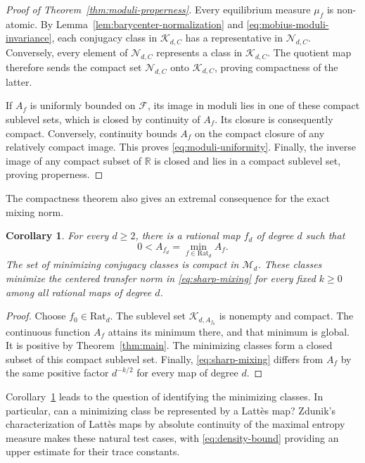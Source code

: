 \documentclass[11pt,reqno]{amsart}
\theoremstyle{plain}
\newtheorem{corollary}[theorem]{Corollary}
\theoremstyle{definition}
\theoremstyle{remark}
\newcommand{\R}{\mathbb R}
\numberwithin{equation}{section}
\begin{document}
\begin{proof}[Proof of Theorem~\ref{thm:moduli-properness}]
Every equilibrium measure $\mu_f$ is non-atomic. By Lemma~\ref{lem:barycenter-normalization} and \eqref{eq:mobius-moduli-invariance}, each conjugacy class in $\mathcal K_{d,C}$ has a representative in $\mathcal N_{d,C}$. Conversely, every element of $\mathcal N_{d,C}$ represents a class in $\mathcal K_{d,C}$. The quotient map therefore sends the compact set $\mathcal N_{d,C}$ onto $\mathcal K_{d,C}$, proving compactness of the latter.

If $A_f$ is uniformly bounded on $\mathcal F$, its image in moduli lies in one of these compact sublevel sets, which is closed by continuity of $A_f$. Its closure is consequently compact. Conversely, continuity bounds $A_f$ on the compact closure of any relatively compact image. This proves \eqref{eq:moduli-uniformity}. Finally, the inverse image of any compact subset of $\R$ is closed and lies in a compact sublevel set, proving properness.
\end{proof}

The compactness theorem also gives an extremal consequence for the exact mixing norm.

\begin{corollary}\label{cor:moduli-minimum}
For every $d\ge2$, there is a rational map $f_d$ of degree $d$ such that
\[
 0<A_{f_d}=\min_{f\in\mathrm{Rat}_d}A_f.
\]
The set of minimizing conjugacy classes is compact in $\mathcal M_d$. These classes minimize the centered transfer norm in \eqref{eq:sharp-mixing} for every fixed $k\ge0$ among all rational maps of degree $d$.
\end{corollary}

\begin{proof}
Choose $f_0\in\mathrm{Rat}_d$. The sublevel set $\mathcal K_{d,A_{f_0}}$ is nonempty and compact. The continuous function $A_f$ attains its minimum there, and that minimum is global. It is positive by Theorem~\ref{thm:main}. The minimizing classes form a closed subset of this compact sublevel set. Finally, \eqref{eq:sharp-mixing} differs from $A_f$ by the same positive factor $d^{-k/2}$ for every map of degree $d$.
\end{proof}


Corollary~\ref{cor:moduli-minimum} leads to the question of identifying the minimizing classes. In particular, can a minimizing class be represented by a Latt\`es map? Zdunik's characterization of Latt\`es maps by absolute continuity of the maximal entropy measure \cite{Zdu90} makes these natural test cases, with \eqref{eq:density-bound} providing an upper estimate for their trace constants.
\end{document}
